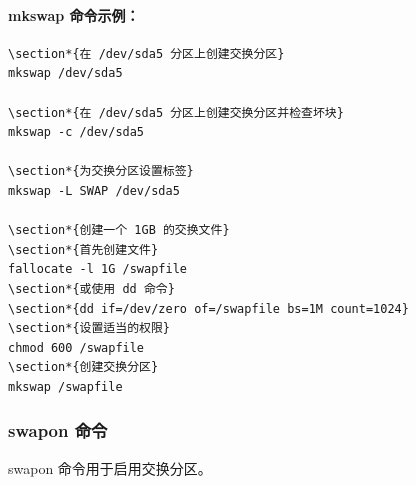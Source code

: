\documentclass[12pt,UTF8]{ctexbook}
\begin{document}
\paragraph{mkswap 命令示例：}
\begin{verbatim}
\section*{在 /dev/sda5 分区上创建交换分区}
mkswap /dev/sda5

\section*{在 /dev/sda5 分区上创建交换分区并检查坏块}
mkswap -c /dev/sda5

\section*{为交换分区设置标签}
mkswap -L SWAP /dev/sda5

\section*{创建一个 1GB 的交换文件}
\section*{首先创建文件}
fallocate -l 1G /swapfile
\section*{或使用 dd 命令}
\section*{dd if=/dev/zero of=/swapfile bs=1M count=1024}
\section*{设置适当的权限}
chmod 600 /swapfile
\section*{创建交换分区}
mkswap /swapfile
\end{verbatim}

\subsubsection{swapon 命令}
swapon 命令用于启用交换分区。
\end{document}
